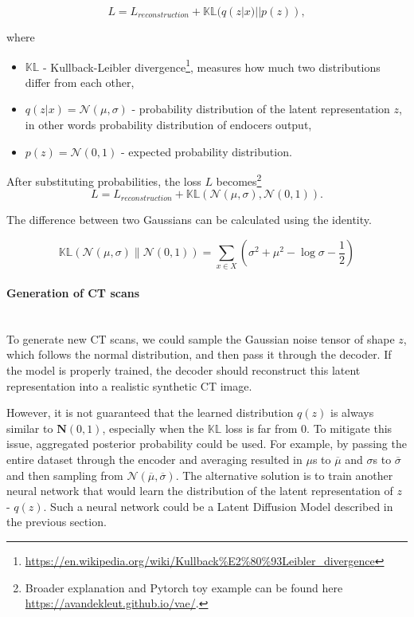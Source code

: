 \begin{equation}
    L = L_{reconstruction} + \mathbb{KL}(q(z | x) || p(z)),
\end{equation}

where 
\begin{itemize}
    \item $\mathbb{KL}$ - Kullback-Leibler divergence\footnote{\url{https://en.wikipedia.org/wiki/Kullback\%E2\%80\%93Leibler_divergence}}, measures how much two distributions differ from each other,
    \item $q(z | x) = \mathcal{N}(\mu, \sigma)$ - probability distribution of the latent representation $z$, in other words probability distribution of endocers output,
    \item $p(z) = \mathcal{N}(0,1)$ - expected probability distribution.
\end{itemize}

After substituting probabilities, the loss $L$ becomes\footnote{Broader explanation and Pytorch toy example can be found here \url{https://avandekleut.github.io/vae/}.}
\begin{equation}
    L = L_{reconstruction} + \mathbb{KL}(\mathcal{N}(\mu,\sigma), \mathcal{N}(0,1)).
\end{equation}

The difference between two Gaussians can be calculated using the identity\cite{7449}. 

\begin{equation}
    \mathbb{KL}\left( \mathcal{N}(\mu, \sigma) \parallel \mathcal{N}(0, 1) \right) = \sum_{x \in X} \left( \sigma^2 + \mu^2 - \log \sigma - \frac{1}{2} \right)
\end{equation}


\paragraph{Generation of CT scans}\mbox{}\\

To generate new CT scans, we could sample the Gaussian noise tensor of shape $z$, which follows the normal distribution, and then pass it through the decoder.
If the model is properly trained, the decoder should reconstruct this latent representation into a realistic synthetic CT image. 

However, it is not guaranteed that the learned distribution $q(z)$ is always similar to $\mathbf{N}(0,1)$, especially when the $\mathbb{KL}$ loss is far from $0$. To mitigate this issue, aggregated posterior probability could be used. For example, by passing the entire dataset through the encoder and averaging resulted in $\mu$s to $\overline{\mu}$ and $\sigma$s to $\overline{\sigma}$ and then sampling from $\mathcal{N}(\overline{\mu}, \overline{\sigma})$. The alternative solution is to train another neural network that would learn the distribution of the latent representation of $z$ - $q(z)$. Such a neural network could be a Latent Diffusion Model described in the previous section.

